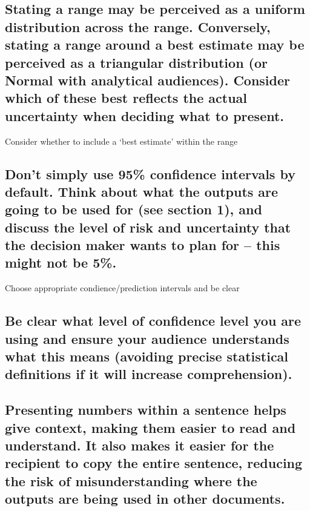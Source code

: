 \documentclass[]{book}
\begin{document}
\subsection{Stating a range may be perceived as a uniform distribution
across the range. Conversely, stating a range around a best estimate may
be perceived as a triangular distribution (or Normal with analytical
audiences). Consider which of these best reflects the actual uncertainty
when deciding what to
present.}\label{stating-a-range-may-be-perceived-as-a-uniform-distribution-across-the-range.-conversely-stating-a-range-around-a-best-estimate-may-be-perceived-as-a-triangular-distribution-or-normal-with-analytical-audiences.-consider-which-of-these-best-reflects-the-actual-uncertainty-when-deciding-what-to-present.}

 Consider whether to include a `best estimate' within the range

\subsection{Don't simply use 95\% confidence intervals by default. Think
about what the outputs are going to be used for (see section 1), and
discuss the level of risk and uncertainty that the decision maker wants
to plan for -- this might not be
5\%.}\label{dont-simply-use-95-confidence-intervals-by-default.-think-about-what-the-outputs-are-going-to-be-used-for-see-section-1-and-discuss-the-level-of-risk-and-uncertainty-that-the-decision-maker-wants-to-plan-for-this-might-not-be-5.}

 Choose appropriate condience/prediction intervals and be clear

\subsection{Be clear what level of confidence level you are using and
ensure your audience understands what this means (avoiding precise
statistical definitions if it will increase
comprehension).}\label{be-clear-what-level-of-confidence-level-you-are-using-and-ensure-your-audience-understands-what-this-means-avoiding-precise-statistical-definitions-if-it-will-increase-comprehension.}

\subsection{Presenting numbers within a sentence helps give context,
making them easier to read and understand. It also makes it easier for
the recipient to copy the entire sentence, reducing the risk of
misunderstanding where the outputs are being used in other
documents.}\label{presenting-numbers-within-a-sentence-helps-give-context-making-them-easier-to-read-and-understand.-it-also-makes-it-easier-for-the-recipient-to-copy-the-entire-sentence-reducing-the-risk-of-misunderstanding-where-the-outputs-are-being-used-in-other-documents.}
\end{document}
